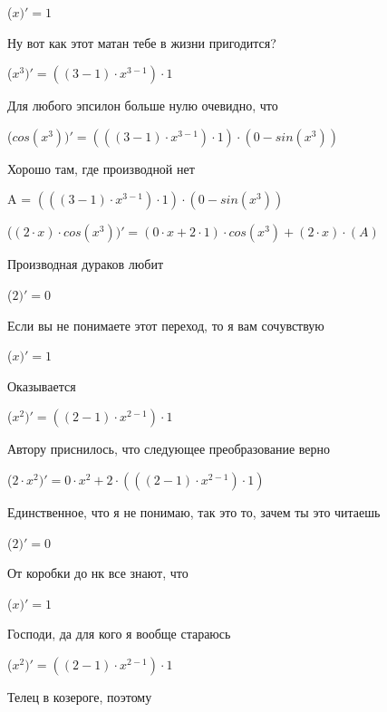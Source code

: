 \documentclass[12pt,a4paper,fleqn]{article}
\begin{document}
\begin{center}
 ($x)'
  = 1$\end{center}
Ну вот как этот матан тебе в жизни пригодится?

\begin{center}
 ($x^{3})'
  = ((3-1) \cdot x^{3-1}) \cdot 1$\end{center}
Для любого эпсилон больше нулю очевидно, что

\begin{center}
 ($cos(x^{3}))'
  = (((3-1) \cdot x^{3-1}) \cdot 1) \cdot (0-sin(x^{3}))$\end{center}
Хорошо там, где производной нет\cite{link2}

\begin{center}
A = $(((3-1) \cdot x^{3-1}) \cdot 1) \cdot (0-sin(x^{3}))$\end{center}
\begin{center}
 ($(2 \cdot x) \cdot cos(x^{3}))'
  = (0 \cdot x+2 \cdot 1) \cdot cos(x^{3})+(2 \cdot x) \cdot (A)$\end{center}
Производная дураков любит\cite{link2}

\begin{center}
 ($2)'
  = 0$\end{center}
Если вы не понимаете этот переход, то я вам сочувствую

\begin{center}
 ($x)'
  = 1$\end{center}
Оказывается

\begin{center}
 ($x^{2})'
  = ((2-1) \cdot x^{2-1}) \cdot 1$\end{center}
Автору приснилось, что следующее преобразование верно

\begin{center}
 ($2 \cdot x^{2})'
  = 0 \cdot x^{2}+2 \cdot (((2-1) \cdot x^{2-1}) \cdot 1)$\end{center}
Единственное, что я не понимаю, так это то, зачем ты это читаешь

\begin{center}
 ($2)'
  = 0$\end{center}
От коробки до нк все знают, что

\begin{center}
 ($x)'
  = 1$\end{center}
Господи, да для кого я вообще стараюсь

\begin{center}
 ($x^{2})'
  = ((2-1) \cdot x^{2-1}) \cdot 1$\end{center}
Телец в козероге, поэтому
\end{document}
